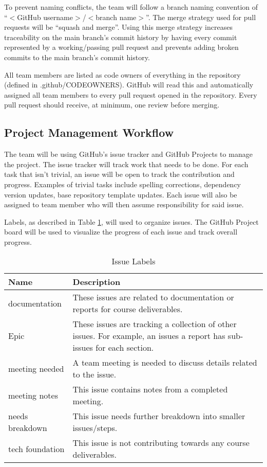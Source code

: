 \documentclass{article}
\begin{document}
To prevent naming conflicts, the team will follow a branch naming convention of
``$<$GitHub username$>$/$<$branch name$>$''. The merge strategy used for pull requests will be
``squash and merge''. Using this merge strategy increases traceability on the main branch's commit
history by having every commit represented by a working/passing pull request and prevents adding
broken commits to the main branch's commit history.

All team members are listed as code owners of everything in the repository (defined in
.github/CODEOWNERS). GitHub will read this and automatically assigned all team members to every pull
request opened in the repository. Every pull request should receive, at minimum, one review before
merging.

\subsection{Project Management Workflow}

The team will be using GitHub's issue tracker and GitHub Projects to manage the project. The issue
tracker will track work that needs to be done. For each task that isn't trivial, an issue will be
open to track the contribution and progress. Examples of trivial tasks include spelling corrections,
dependency version updates, base repository template updates. Each issue will also be assigned to
team member who will then assume responsibility for said issue.

Labels, as described in Table \ref{issueLabels}, will used to organize issues. The GitHub Project
board will be used to visualize the progress of each issue and track overall progress.

\begin{table}[H]
  \centering
  \caption{Issue Labels}
  \vspace{5pt}
  \begin{tabular}{|p{}|p{}|}
      \hline
      \textbf{Name} & \textbf{Description}\\
      \hline
      documentation & These issues are related to documentation or reports for course deliverables.\\
      \hline
      Epic & These issues are tracking a collection of other issues. For example, an issues a report
      has sub-issues for each section.\\
      \hline
      meeting needed & A team meeting is needed to discuss details related to the issue.\\
      \hline
      meeting notes & This issue contains notes from a completed meeting.\\
      \hline
      needs breakdown & This issue needs further breakdown into smaller issues/steps.\\
      \hline
      tech foundation & This issue is not contributing towards any course deliverables.\\
      \hline
  \end{tabular}

  \label{issueLabels}
\end{table}
\end{document}
